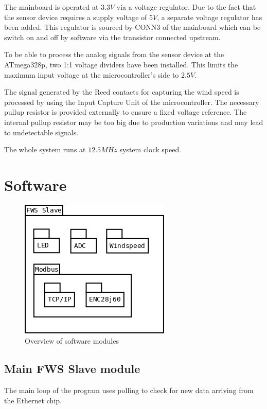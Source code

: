 The mainboard is operated at $3.3 V$ via a voltage regulator. Due to the fact that the sensor device requires a supply voltage of $5 V$, a separate voltage regulator has been added. This regulator is sourced by CONN3 of the mainboard which can be switch on and off by software via the transistor connected upstream.

To be able to process the analog signals from the sensor device at the ATmega328p, two 1:1 voltage dividers have been installed. This limits the maximum input voltage at the microcontroller's side to $2.5 V$.

The signal generated by the Reed contacts for capturing the wind speed is processed by using the Input Capture Unit of the microcontroller. The necessary pullup resistor is provided externally to ensure a fixed voltage reference. The internal pullup resistor may be too big due to production variations and may lead to undetectable signals.

The whole system runs at $12.5 MHz$ system clock speed.

\section{Software}

\begin{figure}[ht]
    \centering
    \includegraphics[width=0.6\linewidth]{graphics/fws_slave.png}
    \caption{Overview of software modules}
    \label{fig:slave_software}
\end{figure}

\subsection{Main FWS Slave module}
The main loop of the program uses polling to check for new data arriving from the Ethernet chip.

